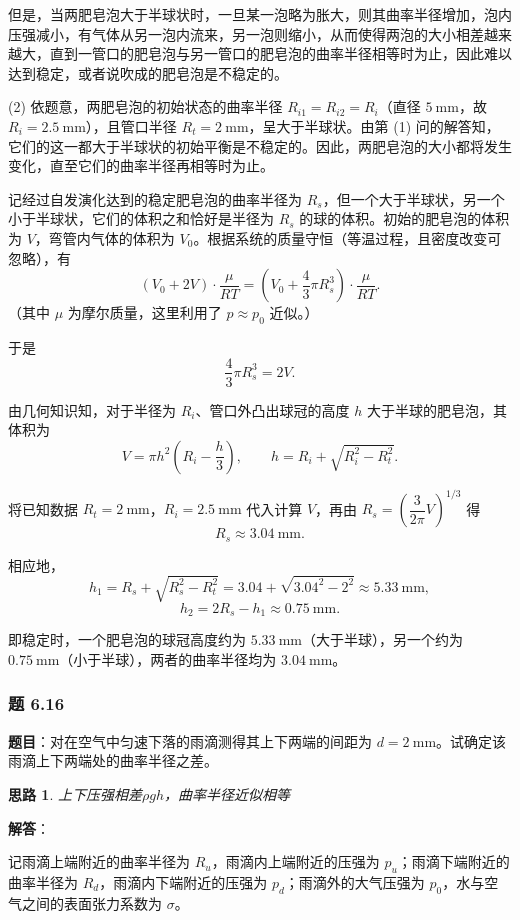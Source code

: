 \documentclass[UTF8]{ctexart}
\newtheorem{thoughts}{思路}[subsection]
\begin{document}
但是，当两肥皂泡大于半球状时，一旦某一泡略为胀大，则其曲率半径增加，泡内压强减小，有气体从另一泡内流来，另一泡则缩小，从而使得两泡的大小相差越来越大，直到一管口的肥皂泡与另一管口的肥皂泡的曲率半径相等时为止，因此难以达到稳定，或者说吹成的肥皂泡是不稳定的。

(2) 依题意，两肥皂泡的初始状态的曲率半径 $R_{i1}=R_{i2}=R_i$（直径 $5\ \mathrm{mm}$，故 $R_i=2.5\ \mathrm{mm}$），且管口半径 $R_t=2\ \mathrm{mm}$，呈大于半球状。由第 (1) 问的解答知，它们的这一都大于半球状的初始平衡是不稳定的。因此，两肥皂泡的大小都将发生变化，直至它们的曲率半径再相等时为止。

记经过自发演化达到的稳定肥皂泡的曲率半径为 $R_s$，但一个大于半球状，另一个小于半球状，它们的体积之和恰好是半径为 $R_s$ 的球的体积。初始的肥皂泡的体积为 $V$，弯管内气体的体积为 $V_0$。根据系统的质量守恒（等温过程，且密度改变可忽略），有
\[
(V_0+2V)\cdot\frac{\mu}{RT}=\left(V_0+\frac{4}{3}\pi R_s^3\right)\cdot\frac{\mu}{RT}.
\]
（其中 $\mu$ 为摩尔质量，这里利用了 $p\approx p_0$ 近似。）

于是
\[
\frac{4}{3}\pi R_s^3=2V.
\]

由几何知识知，对于半径为 $R_i$、管口外凸出球冠的高度 $h$ 大于半球的肥皂泡，其体积为
\[
V=\pi h^2\left(R_i-\frac{h}{3}\right),
\qquad h=R_i+\sqrt{R_i^2-R_t^2}.
\]

将已知数据 $R_t=2\ \mathrm{mm}$，$R_i=2.5\ \mathrm{mm}$ 代入计算 $V$，再由 $R_s=\left(\dfrac{3}{2\pi}V\right)^{1/3}$ 得
\[
\boxed{R_s\approx 3.04\ \mathrm{mm}}.
\]

相应地，
\[
h_1=R_s+\sqrt{R_s^2-R_t^2}=3.04+\sqrt{3.04^2-2^2}\approx 5.33\ \mathrm{mm},
\]
\[
h_2=2R_s-h_1\approx 0.75\ \mathrm{mm}.
\]

即稳定时，一个肥皂泡的球冠高度约为 $5.33\ \mathrm{mm}$（大于半球），另一个约为 $0.75\ \mathrm{mm}$（小于半球），两者的曲率半径均为 $3.04\ \mathrm{mm}$。



\subsubsection{题 6.16}

\textbf{题目}：对在空气中匀速下落的雨滴测得其上下两端的间距为 $d=2\ \mathrm{mm}$。试确定该雨滴上下两端处的曲率半径之差。

\begin{thoughts}
  上下压强相差$\rho gh$，曲率半径近似相等
\end{thoughts}

\textbf{解答}：

记雨滴上端附近的曲率半径为 $R_u$，雨滴内上端附近的压强为 $p_u$；雨滴下端附近的曲率半径为 $R_d$，雨滴内下端附近的压强为 $p_d$；雨滴外的大气压强为 $p_0$，水与空气之间的表面张力系数为 $\sigma$。
\end{document}

